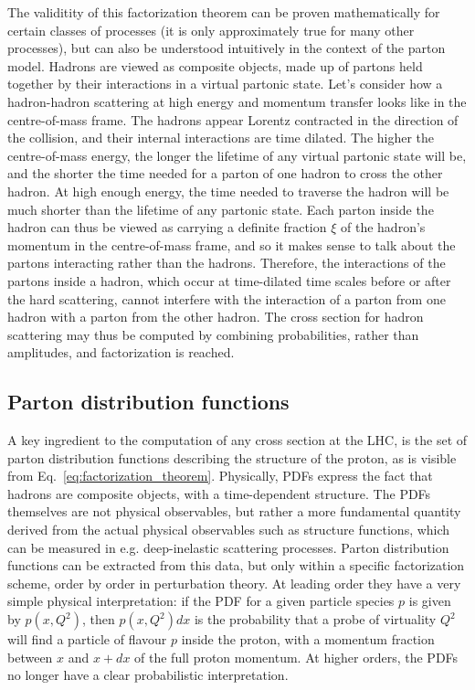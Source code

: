 The validitity of this factorization theorem can be proven mathematically for certain classes of
processes (it is only approximately true for many other processes), but can also be understood
intuitively in the context of the parton model. 
Hadrons are viewed as composite objects, made up of partons held together by their interactions in
a virtual partonic state.
Let's consider how a hadron-hadron scattering at high energy and momentum transfer looks like in the
centre-of-mass frame. The hadrons appear Lorentz contracted in the direction of the collision, and
their internal interactions are time dilated. The higher the centre-of-mass energy, the longer the
lifetime of any virtual partonic state will be, and the shorter the time needed for a parton of one
hadron to cross the other hadron. At high enough energy, the time needed to traverse the hadron
will be much shorter than the lifetime of any partonic state. Each parton inside the hadron can
thus be viewed as carrying a definite fraction $\xi$ of the hadron's momentum in the centre-of-mass
frame, and so it makes sense to talk about the partons interacting rather than the hadrons.  
Therefore, the interactions of the partons inside a hadron, which occur at time-dilated time
scales before or after the hard scattering, cannot interfere with the interaction of a parton
from one hadron with a parton from the other hadron. 
The cross section for hadron scattering may thus be computed by
combining probabilities, rather than amplitudes, and factorization is reached. 




\subsection{Parton distribution functions \label{sec:event_pdfs}}

A key ingredient to the computation of any cross section at the LHC, is the set of parton
distribution functions describing the structure of the proton, as
is visible from Eq.~\ref{eq:factorization_theorem}. 
Physically, PDFs express the fact that hadrons are composite objects, with a time-dependent
structure. The PDFs themselves are not physical observables, but rather a more fundamental quantity
derived from the actual physical observables such as structure functions, which can be measured
in e.g. deep-inelastic scattering processes. 
Parton distribution functions can be extracted from this data, but only within a specific
factorization scheme, order by order in perturbation theory. 
At leading order they have a very simple physical interpretation: if the PDF for a given particle
species $p$ is given by $p(x,Q^2)$, then $p(x,Q^2) dx$ is the probability that a probe of
virtuality $Q^2$ will find a particle of flavour $p$ inside the proton, with a
momentum fraction between $x$ and $x + dx$ of the full proton momentum. 
At higher orders, the PDFs no longer have a clear probabilistic interpretation. 


